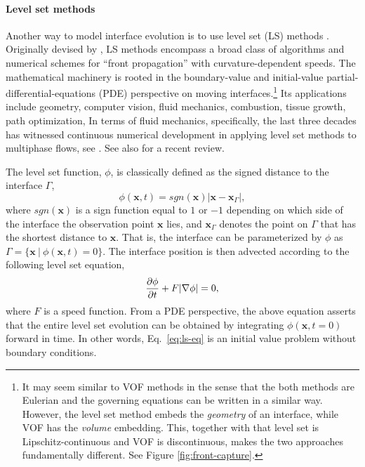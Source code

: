\medskip
\paragraph{\bf Level set methods}

Another way to model interface evolution is to use level set (LS) methods \citep{sethian_1999a}.
Originally devised by \cite{Osher_Sethian_levelset}, LS methods encompass a broad class of algorithms and numerical schemes for ``front propagation'' with curvature-dependent speeds.
The mathematical machinery is rooted in the boundary-value and initial-value partial-differential-equations (PDE) perspective on moving interfaces.\footnote{It may seem similar to VOF methods in the sense that the both methods are Eulerian and the governing equations can be written in a similar way. However, the level set method embeds the \emph{geometry} of an interface, while VOF has the \emph{volume} embedding. This, together with that level set is Lipschitz-continuous and VOF is discontinuous, makes the two approaches fundamentally different. See Figure \ref{fig:front-capture}.}
Its applications include geometry, computer vision, fluid mechanics, combustion, tissue growth, path optimization, \etc
In terms of fluid mechanics, specifically, the last three decades has witnessed continuous numerical development in applying level set methods to multiphase flows, see \eg \cite{Mulder_JCP_1992, Sussman_JCP_1994, Sussman_JCP_2000, Enright_JCP_2002, Olsson_JCP_2005, Marchandise_JCP_2007, Desjardins_JCP_2008, Desjardins_JCP_2009, Aanjaneya_JCP_2013, Luo_JCP_2015, ICLS}. See also \cite{Gibou_Fedkiv_Osher} for a recent review.

The level set function, $\phi$, is classically defined as the signed distance to the interface $\Gamma$,
\begin{equation} \label{eq:ls-def}
    \phi({\bm x},t) = sgn({\bm x}) |{\bm x}-{\bm x}_\Gamma|,
\end{equation}
where $sgn({\bm x})$ is a sign function equal to $1$ or $-1$ depending on which side of the interface the observation point $\bm x$ lies, and ${\bm x}_\Gamma$ denotes the point on $\Gamma$ that has the shortest distance to $\bm x$.
That is, the interface can be parameterized by $\phi$ as $\Gamma = \{ {\bm x} ~ \rvert ~ \phi({\bm x},t) = 0 \}$.
The interface position is then advected according to the following level set equation,
\begin{equation} \label{eq:ls-eq}
  \frac{\partial \phi}{\partial t} + F \lvert\nabla \phi\rvert = 0,
\end{equation}
where $F$ is a speed function.
From a PDE perspective, the above equation asserts that the entire level set evolution can be obtained by integrating $\phi({\bm x},t=0)$ forward in time.
In other words, Eq.\ \eqref{eq:ls-eq} is an initial value problem without boundary conditions.


